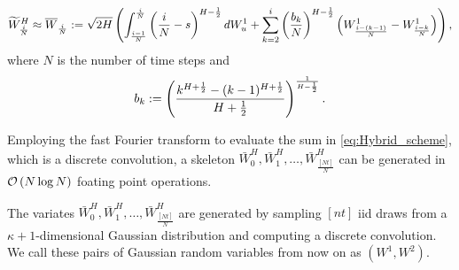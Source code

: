 \begin{equation*}\label{eq:Hybrid_scheme}
\widetilde{W}^H_{\frac{i}{N}} \approx \overline{W}_{\frac{i}{N}}:= \sqrt{2H} \left(\int_{\frac{i-1}{N}}^{\frac{i}{N}} \left(\frac{i}{N} -s\right)^{H-\frac{1}{2}} dW_u^1+\sum_{k=2}^{i} \left(\frac{b_k}{N}\right)^{H-\frac{1}{2}} \left(W_{\frac{i-(k-1)}{N}}^1-W_{\frac{i-k}{N}}^1\right)\right) ,
\end{equation*}
where $N$ is the number of time steps and 
$$ b_k:=\left(\frac{k^{H+\frac{1}{2}}-(k-1)^{H+\frac{1}{2} }}{H+\frac{1}{2}}\right)^{\frac{1}{H-\frac{1}{2}}} .$$

Employing the fast Fourier transform to evaluate the sum in \eqref{eq:Hybrid_scheme}, which is a discrete convolution, a skeleton $\bar{W}_0^{H},\bar{W}_1^{H},\dots,\bar{W}_{\frac{[Nt]}{N}}^{H}$ can be generated in ${\mathcal{O}}\left(N \log N\right)$ foating point operations.



The variates $\bar{W}_0^{H},\bar{W}_1^{H},\dots,\bar{W}_{\frac{[Nt]}{N}}^{H}$ are  generated by sampling $[nt]$ iid draws from a $\kappa+1$-dimensional Gaussian distribution and computing a discrete convolution. We call these pairs  of Gaussian random variables from now on as $(W^1,W^2)$.
